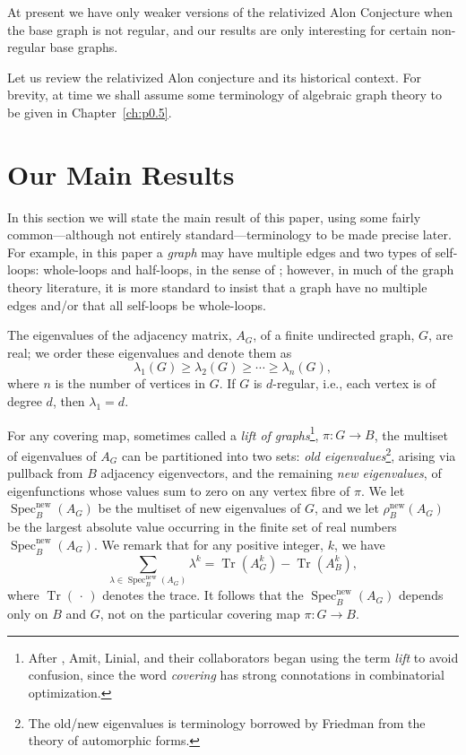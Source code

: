 \documentclass{memo-l}
\theoremstyle{plain}
\theoremstyle{definition}
\numberwithin{section}{chapter}
\numberwithin{equation}{chapter}
\DeclareMathOperator{\Tr}{Tr}
\DeclareMathOperator{\Spec}{Spec}
\newcommand{\from}{\colon}
\newcommand{\rhonew}{\rho^{\mathrm{new}}}
\newcommand{\specnew}{\Spec^{\mathrm{new}}}
\newcommand{\Specnew}{\Spec^{\mathrm{new}}}
\theoremstyle{plain}
\theoremstyle{definition}
\begin{document}
At present we have only weaker versions of the relativized
Alon Conjecture when the base graph is not regular, and our results 
are only interesting for certain non-regular base graphs.

Let us review the relativized Alon conjecture and its historical context.
For brevity,
at time we shall assume some terminology of algebraic graph theory to
be given in Chapter~\ref{ch:p0.5}.



\section{Our Main Results}
\label{se:p0-main}

In this section we will state the main result of this paper, using
some fairly common---although not entirely standard---terminology 
to be made precise later.
For example, in this paper a {\em \gls{graph}} may have multiple edges and two
types of \glspl{self-loop}: \glspl{whole-loop} and \glspl{half-loop}, 
in the sense of
\cite{friedman_geometric_aspects}; however, in much of the graph theory
literature, it is more standard to insist that
a graph have no multiple edges and/or that all self-loops be whole-loops.

The eigenvalues of the adjacency matrix,
 $A_G$, 
of a finite undirected graph, $G$, are
real; we order these eigenvalues and denote them as
\begin{equation}\label{eq:lambda_i_notation}
\lambda_1(G)\ge\lambda_2(G)\ge\cdots\ge\lambda_n(G),
\end{equation}
where $n$ is the number of vertices in $G$.  If $G$ is $d$-regular, i.e.,
each vertex is of degree $d$,
then $\lambda_1=d$.

For any \gls{covering map}, sometimes called 
a {\em lift of graphs}\footnote{After \cite{amit1}, Amit, Linial, and their
collaborators began using the term {\em lift} to avoid confusion,
since the word {\em covering} has strong connotations in combinatorial
optimization\cite{amit0,amit2,amit3,rozenman}.  
},
$\pi\from G\to B$,
the multiset of eigenvalues of $A_G$ can be partitioned into
two sets: {\em old eigenvalues}\footnote{The old/new eigenvalues is terminology
borrowed
by Friedman \cite{friedman_relative_boolean,friedman_relative}
from the theory of automorphic forms.}, arising via pullback
from $B$ adjacency eigenvectors, and the remaining
{\em new eigenvalues},
of eigenfunctions whose values sum to zero on any vertex fibre of
$\pi$.
We let 
$\Specnew_B(A_G)$ be the multiset of new eigenvalues of $G$,
and we let  
$\rhonew_B(A_G)$ be the largest absolute value
occurring in the finite set of real numbers $\specnew_B(A_G)$.
We remark that for any positive integer, $k$, we have
\begin{equation}\label{eq:independent_of_covering_map}
\sum_{\lambda\in\specnew_B(A_G)} \lambda^k 
=
\Tr(A_G^k) - \Tr(A_B^k),
\end{equation}
where
$\Tr(\,\cdot\,)$ denotes the trace.
It follows that the $\specnew_B(A_G)$ depends only on $B$ and $G$, not
on the particular covering map $\pi\from G\to B$.
\end{document}
